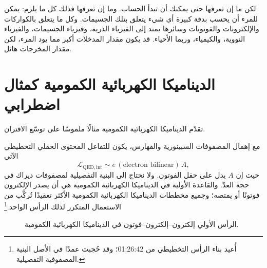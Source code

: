 لكن ما إن تعرفها حتى يمكنك أن تبدأ الحساب. وما إن تعرفها فذلك كل ما يلزم: يمكن للمرء أن يحسب بدقة كبيرة أي شيء يتعلق بتلك الجسيمات. وكل ما يتعلق بالكواركات والإلكترونات والفوتونات وسائرها يمتد إلى الفيزياء الذرية، وفيزياء الجسيمات، والفيزياء النووية، والكيمياء، وربما الأحياء. قد يكون مقدار المدخلات أكبر مما يود المرء، لكن مقدار المخرجات هائل.

\section{الديناميكا الكهربائية الكمومية كمثال اضطرابي}

تقدّم الديناميكا الكهربائية الكمومية مثالًا ملموسًا على توسّع الاقتران.

\begin{classroomqa}
\end{classroomqa}

مع إهمال المصفوفات السبينورية والفهارس، يكون للتفاعل المحتوى الحقلي التخطيطي الآتي
\begin{equation}
\mathcal{L}_{\mathrm{QED,int}}
\sim e\,(\text{electron bilinear})\,A,
\end{equation}
حيث إن \(A\) يدل على حقل الفوتون. ولا نحتاج إلى البنية التفصيلية لمصفوفات ديراك في حجة العدّ. والقاعدة الأولية في الديناميكا الكهربائية الكمومية هي أن يصدر الإلكترون فوتونًا أو يمتصه؛ وجميع مخططات الديناميكا الكهربائية الكمومية الأكثر تعقيدًا تُركَّب من الاستعمال المتكرر لذلك الرأس الواحد.\footnote{أُعيد بناء الرأس التخطيطي من 01:26:42؛ وقد حُجبت عمدًا في الأصل البنية المصفوفية التفصيلية.}

\begin{figure}[htbp]
\centering
{}
\caption{الرأس الأولي إلكترون--إلكترون--فوتون في الديناميكا الكهربائية الكمومية.}
\end{figure}

\begin{classroomqa}
\end{classroomqa}

